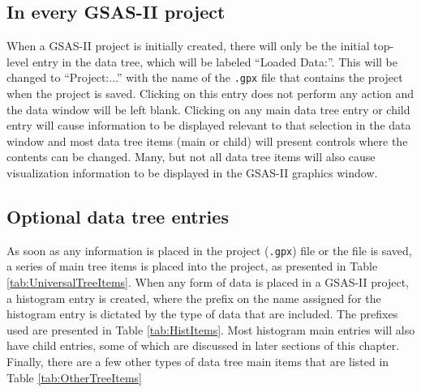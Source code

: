 \subsection{In every GSAS-II project}
When a GSAS-II project is initially created, there will only be the initial top-level entry in the data tree, which will be labeled ``Loaded Data:''. This will be changed to ``Project:...'' with the name of the \texttt{.gpx} file that contains the project when the project is saved. Clicking on this entry does not perform any action and the data window will be left blank. Clicking on any main data tree entry or child entry will cause information to be displayed relevant to that selection in the data window and most data tree items (main or child) will present controls where the contents can be changed. Many, but not all data tree items will also cause visualization information to be displayed in the GSAS-II graphics window. 

\subsection{Optional data tree entries}
As soon as any information is placed in the project (\texttt{.gpx}) file or the file is saved, a series of main tree items is placed into the project, as presented in Table \ref{tab:UniversalTreeItems}. 
When any form of data is placed in a GSAS-II project, a histogram entry is created, where the prefix on the name assigned for the histogram entry is dictated by the type of data that are included. The prefixes used are presented in Table \ref{tab:HistItems}. Most histogram main entries will also have child entries, some of which are discussed in later sections of this chapter.
Finally, there are a few other types of data tree main items that are listed in Table \ref{tab:OtherTreeItems}

